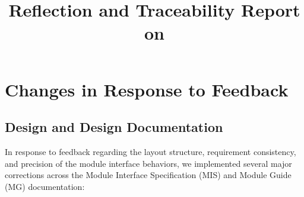 \documentclass{article}
\title{Reflection and Traceability Report on \progname}
\author{\authname}
\date{}
\begin{document}
\maketitle


\section{Changes in Response to Feedback}

\subsection{Design and Design Documentation}

In response to feedback regarding the layout structure, requirement consistency, and precision of the module interface behaviors, we implemented several major corrections across the Module Interface Specification (MIS) and Module Guide (MG) documentation:
\end{document}

